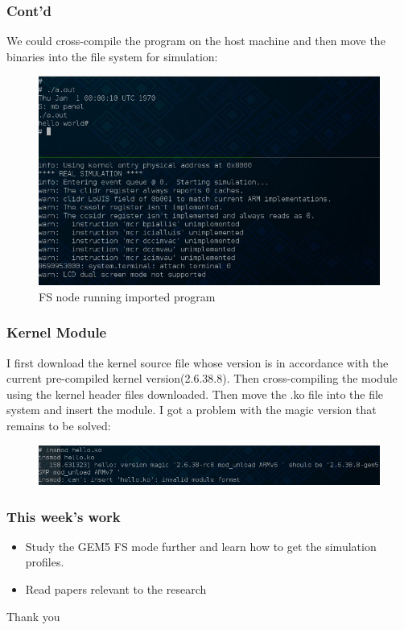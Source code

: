 \documentclass{beamer}
\begin{document}
\begin{frame}
    \frametitle{Cont'd}
    We could cross-compile the program on the host machine and then move the
    binaries into the file system for simulation:	
    \begin{figure}[H]
	\begin{center}
	    \includegraphics[scale=0.5]{back11.jpg}
	\end{center}
	\caption{FS node running imported program}
    \end{figure}
\end{frame}

\begin{frame}
    \frametitle{Kernel Module}
    I first download the kernel source file whose version is in accordance with
    the current pre-compiled kernel version(2.6.38.8). Then cross-compiling
    the module using the kernel header files downloaded. Then move the .ko
    file into the file system and insert the module. I got a problem with the
    magic version that remains to be solved:
    \begin{figure}[H]
	\begin{center}
	    \includegraphics[scale=0.5]{back12.jpg}
	\end{center}
    \end{figure}
\end{frame}

\begin{frame}
    \frametitle{This week's work}
    \begin{itemize}
	\item Study the GEM5 FS mode further and learn how to get the
	    simulation profiles.
	\item Read papers relevant to the research
    \end{itemize}
\end{frame}

\begin{frame}
\Huge{\centerline{Thank you}}
\end{frame}
\end{document}
